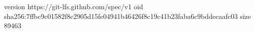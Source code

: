 version https://git-lfs.github.com/spec/v1
oid sha256:7ffbc9c01582f8c2905d15fe04941b46426f8c19c41b23faba6c9bddecaafc03
size 89463
